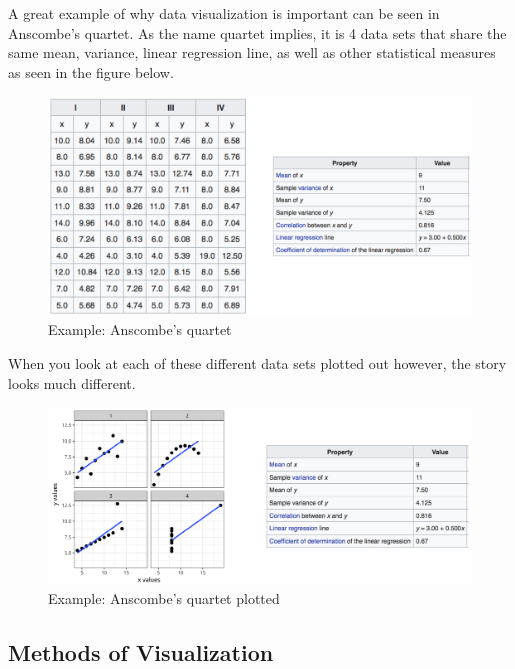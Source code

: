 \documentclass{article}
\begin{document}
\begin{flushleft}
A great example of why data visualization is important can be seen in Anscombe’s quartet. As the name quartet implies, it is 4 data sets that share the same mean, variance, linear regression line, as well as other statistical measures as seen in the figure below.
\end{flushleft}

\begin{figure}[H]
    \centering
    \includegraphics[width=.75\textwidth]{Anscombes_quartet.png}
    \caption{Example: Anscombe's quartet}
    \label{fig:Anscombes}
\end{figure}

\begin{flushleft}
When you look at each of these different data sets plotted out however, the story looks much different.
\end{flushleft}

\begin{figure}[H]
    \centering
    \includegraphics[width=.75\textwidth]{Anscombes_quartet_plotted.png}
    \caption{Example: Anscombe's quartet plotted}
    \label{fig:Anscombes_plotted}
\end{figure}

\subsection{Methods of Visualization}
\end{document}
